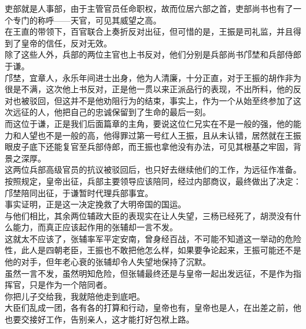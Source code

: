 \begin{multicols}{\theparacolNo}
吏部就是人事部，由于主管官员任命职权，故而位居六部之首，吏部尚书也有了一个专门的称呼——天官，可见其威望之高。\\

在王直的带领下，百官联合上奏折反对出征，但可惜的是，王振是司礼监，并且得到了皇帝的信任，反对无效。\\

除了这些人外，兵部的两位主官也上书反对，他们分别是兵部尚书邝埜和兵部侍郎于谦。\\

邝埜，宜章人，永乐年间进士出身，他为人清廉，十分正直，对于王振的胡作非为很是不满，这次他上书反对，正是他一贯以来正派品行的表现，不出所料，他的反对也被驳回，但这并不是他劝阻行为的结束，事实上，作为一个从始至终参加了这次远征的人，他把自己的忠诚保留到了生命的最后一刻。\\

而这位于谦，正是我们后面篇章的主角，要说这位仁兄实在不是一般的强，他的能力和人望也不是一般的高，他得罪过第一号红人王振，且从未认错，居然就在王振眼皮子底下还能复官至兵部侍郎，而王振也拿他没有办法，可见其根基之牢固，背景之深厚。\\

这两位兵部高级官员的抗议被驳回后，也只好去继续他们的工作，为远征作准备。按照规定，皇帝出征，兵部主要领导应该陪同，经过内部商议，最终做出了决定：\\

邝埜陪同出征，于谦暂时代理兵部事宜。\\

事实证明，正是这一决定挽救了大明帝国的国运。\\

与他们相比，其余两位辅政大臣的表现实在让人失望，三杨已经死了，胡濙没有什么能力，而真正应该起作用的张辅却一言不发。\\

这就太不应该了，张辅率军平定安南，曾身经百战，不可能不知道这一举动的危险性，此人是四朝老臣，王振也不敢把他怎么样，如果要争论起来，王振可能还不是他的对手，但年老心衰的张辅却令人失望地保持了沉默。\\

虽然一言不发，虽然明知危险，但张辅最终还是与皇帝一起出发远征，不是作为指挥官，只是作为一个陪同者。\\

你把儿子交给我，我就陪他走到底吧。\\

大臣们乱成一团，各有各的打算和行动，皇帝也有，皇帝也是人，在出差之前，他也要交接好工作，告别亲人，这才能打好包袱上路。\\


\end{multicols}
